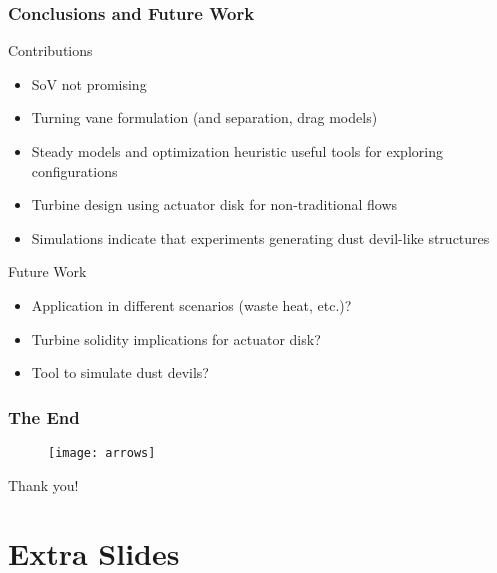 \documentclass[mathserif]{beamer}
\begin{document}
%
%
\begin{frame}
 \frametitle{Conclusions and Future Work}

 \begin{block}{Contributions}
  \begin{itemize}
  \item SoV not promising
  \item Turning vane formulation (and separation, drag models)
  \item Steady models and optimization heuristic useful tools for exploring configurations
  \item Turbine design using actuator disk for non-traditional flows
  \item Simulations indicate that experiments generating dust devil-like structures
  \end{itemize}
 \end{block}


 \begin{block}{Future Work}
  \begin{itemize}
  \item Application in different scenarios (waste heat, etc.)?
  \item Turbine solidity implications for actuator disk?
  \item Tool to simulate dust devils?
  \end{itemize}
 \end{block}
 


\end{frame}

%
%
%
 \begin{frame}
   \frametitle{The End}

   \begin{figure}[htb]
     \centering
     \texttt{[image: arrows]}
   \end{figure}

   \begin{block}{Thank you!}
    \end{block}
 \end{frame}


%
\appendix
\section{Extra Slides}
\end{document}
